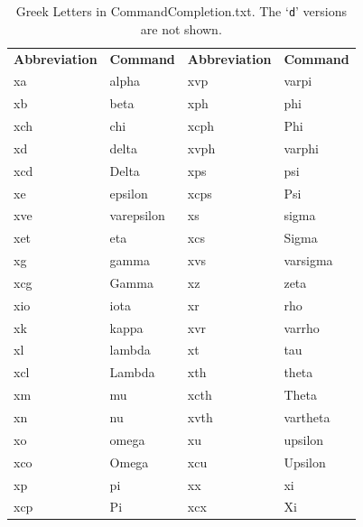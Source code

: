 \documentclass[11pt]{article}
\newcommand{\CCT}{\textsf{CommandCompletion.txt}}
\begin{document}
\begin{table}\small\centering
\begin{tabular}{llll}
\textbf{Abbreviation} & \textbf{Command} & \textbf{Abbreviation} & \textbf{Command} \\
\cmidrule[0.5pt](lr){1-1} \cmidrule[0.5pt](lr){2-2} \cmidrule[0.5pt](lr){3-3} \cmidrule[0.5pt](lr){4-4}
xa  & alpha      & xvp  & varpi \\
xb  & beta       & xph  & phi \\
xch & chi        & xcph & Phi \\
xd  & delta      & xvph & varphi \\
xcd & Delta      & xps  & psi \\
xe  & epsilon    & xcps & Psi \\
xve & varepsilon & xs   & sigma \\
xet & eta        & xcs  & Sigma \\
xg  & gamma      & xvs  & varsigma \\
xcg & Gamma      & xz   & zeta \\
xio & iota       & xr   & rho \\
xk  & kappa      & xvr  & varrho \\
xl  & lambda     & xt   & tau \\
xcl & Lambda     & xth  & theta \\
xm  & mu         & xcth & Theta \\
xn  & nu         & xvth & vartheta \\
xo  & omega      & xu   & upsilon \\
xco & Omega      & xcu  & Upsilon \\
xp  & pi         & xx   & xi \\
xcp & Pi         & xcx  & Xi \\
\end{tabular}
\caption{Greek Letters in \CCT. The `\texttt{d}' versions are not shown.}
\label{tbl:greek}
\end{table}
\end{document}
